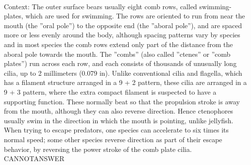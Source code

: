\documentclass[11pt,a4paper, onecolumn]{article}
\begin{document}
\\ Context: The outer surface bears usually eight comb rows, called swimming-plates, which are used for swimming. The rows are oriented to run from near the mouth (the ''oral pole'') to the opposite end (the ''aboral pole''), and are spaced more or less evenly around the body, although spacing patterns vary by species and in most species the comb rows extend only part of the distance from the aboral pole towards the mouth. The ''combs'' (also called ''ctenes'' or ''comb plates'') run across each row, and each consists of thousands of unusually long cilia, up to 2 millimeters (0.079 in). Unlike conventional cilia and flagella, which has a filament structure arranged in a 9 + 2 pattern, these cilia are arranged in a 9 + 3 pattern, where the extra compact filament is suspected to have a supporting function. These normally beat so that the propulsion stroke is away from the mouth, although they can also reverse direction. Hence ctenophores usually swim in the direction in which the mouth is pointing, unlike jellyfish. When trying to escape predators, one species can accelerate to six times its normal speed; some other species reverse direction as part of their escape behavior, by reversing the power stroke of the comb plate cilia. CANNOTANSWER
\end{document}
